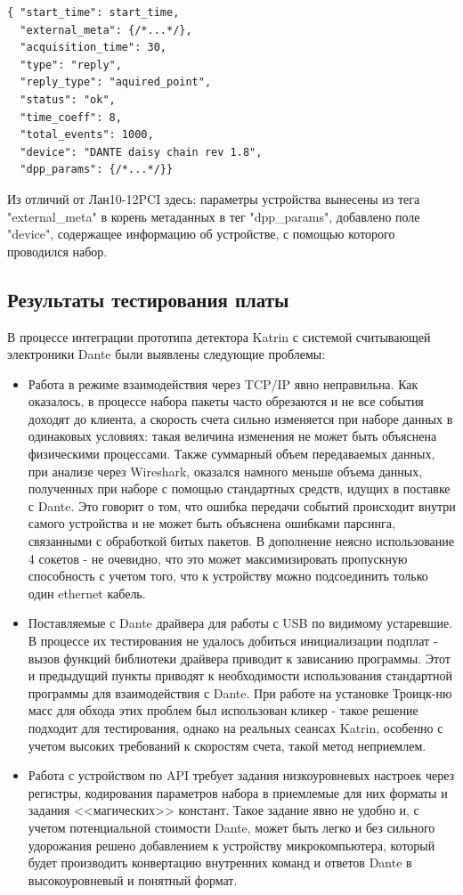 \documentclass[a4paper,14pt]{extreport}
\begin{document}
\begin{lstlisting}[caption={Метаданные пакета с набранными Dante событиями.}, captionpos=b]
{ "start_time": start_time,
  "external_meta": {/*...*/},
  "acquisition_time": 30,
  "type": "reply",
  "reply_type": "aquired_point",
  "status": "ok",
  "time_coeff": 8,
  "total_events": 1000,
  "device": "DANTE daisy chain rev 1.8",
  "dpp_params": {/*...*/}}
\end{lstlisting}

Из отличий от Лан10-12PCI здесь: параметры устройства вынесены из тега "external\_meta" в корень метаданных в тег "dpp\_params", добавлено поле "device", содержащее информацию об устройстве, с помощью которого проводился набор.

\subsection{Результаты тестирования платы}

В процессе интеграции прототипа детектора Katrin с системой считывающей электроники Dante были выявлены следующие проблемы:
\begin{itemize}
    \item Работа в режиме взаимодействия через TCP/IP явно неправильна. Как оказалось, в процессе набора пакеты часто обрезаются и не все события доходят до клиента, а скорость счета сильно изменяется при наборе данных в одинаковых условиях: такая величина изменения не может быть объяснена физическими процессами. Также суммарный объем передаваемых данных, при анализе через Wireshark, оказался намного меньше объема данных, полученных при наборе с помощью стандартных средств, идущих в поставке с Dante. Это говорит о том, что ошибка передачи событий происходит внутри самого устройства и не может быть объяснена ошибками парсинга, связанными с обработкой битых пакетов. В дополнение неясно использование 4 сокетов - не очевидно, что это может максимизировать пропускную способность с учетом того, что к устройству можно подсоединить только один ethernet кабель. 
    \item Поставляемые с Dante драйвера для работы с USB по видимому устаревшие. В процессе их тестирования не удалось добиться инициализации подплат - вызов функций библиотеки драйвера приводит к зависанию программы. Этот и предыдущий пункты приводят к необходимости использования стандартной программы для взаимодействия с Dante. При работе на установке Троицк-ню масс для обхода этих проблем был использован кликер - такое решение подходит для тестирования, однако на реальных сеансах Katrin, особенно с учетом высоких требований к скоростям счета, такой метод неприемлем.
    \item Работа с устройством по API требует задания низкоуровневых настроек через регистры, кодирования параметров набора в приемлемые для них форматы и задания <<магических>> констант. Такое задание явно не удобно и, с учетом потенциальной стоимости Dante, может быть легко и без сильного удорожания решено добавлением к устройству микрокомпьютера, который будет производить конвертацию внутренних команд и ответов Dante в высокоуровневый и понятный формат.
\end{itemize}
\end{document}
